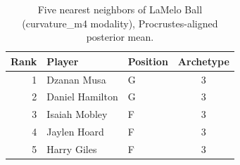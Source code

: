\begin{table}[htbp]
  \centering\small
  \begin{tabular}{rllc}
    \toprule
    Rank & Player & Position & Archetype \\
    \midrule
    1 & Dzanan Musa & G & 3 \\
    2 & Daniel Hamilton & G & 3 \\
    3 & Isaiah Mobley & F & 3 \\
    4 & Jaylen Hoard & F & 3 \\
    5 & Harry Giles & F & 3 \\
    \bottomrule
  \end{tabular}
  \caption{Five nearest neighbors of LaMelo Ball (curvature_m4 modality), Procrustes-aligned posterior mean.}
  \label{tab:LaMelo_Ball_neighbors_curvature_m4}
\end{table}

